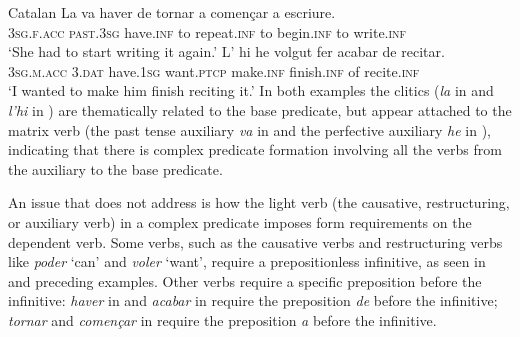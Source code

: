 \documentclass[output=paper,hidelinks]{langscibook}
\begin{document}
\ea\label{ex:Romance:58} Catalan
\ea\label{ex:Romance:58a}
\gll La va haver de tornar a començar a escriure.\\
       \textsc{3sg.f.acc} \textsc{past.3sg} have.\textsc{inf} to repeat.\textsc{inf} to begin.\textsc{inf} to write.\textsc{inf}\\
\glt   `She had to start writing it again.'
\ex\label{ex:Romance:58b}
\gll
 L' hi he volgut fer acabar de recitar.\\
       \textsc{3sg.m.acc} 3.\textsc{dat} have.\textsc{1sg} want.\textsc{ptcp} make.\textsc{inf} finish.\textsc{inf} of recite.\textsc{inf}\\
\glt   `I wanted to make him finish reciting it.'\z\z
In both examples the clitics (\textit{la} in  and \textit{l'hi} in ) are thematically related to the base predicate, but appear attached to the matrix verb (the past tense auxiliary \textit{va} in  and the perfective auxiliary \textit{he} in ), indicating that there is complex predicate formation involving all the verbs from the auxiliary to the base predicate.

An issue that \citet{alsina1996the-role,Alsina1997} does not address is how the light verb (the causative, restructuring, or auxiliary verb) in a complex predicate imposes form requirements on the dependent verb. Some verbs, such as the causative verbs and restructuring verbs like \textit{poder} `can' and \textit{voler} `want', require a prepositionless infinitive, as seen in  and preceding examples. Other verbs require a specific preposition before the infinitive: \textit{haver} in  and \textit{acabar} in  require the preposition \textit{de} before the infinitive; \textit{tornar} and \textit{començar} in  require the preposition \textit{a} before the infinitive. 
\end{document}
